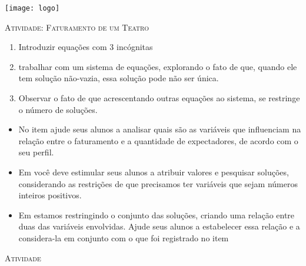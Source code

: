 \documentclass[10 pt,usenames,dvipsnames, oneside]{article}
\begin{document}
\begin{center}
  \begin{minipage}[l]{3cm}
\texttt{[image: logo]}    
\end{minipage}\hfill
\begin{minipage}[r]{.8\textwidth}
 {\Large \scshape Atividade: Faturamento de um Teatro}  
\end{minipage}
\end{center}
\vspace{.2cm}

\ifdefined\prof

\begin{goals}
\begin{enumerate}
\item  Introduzir equações com 3 incógnitas
\item trabalhar com um sistema de equações, explorando o fato de que, quando ele tem solução não-vazia, essa solução pode não ser única.
\item Observar o fato de que acrescentando outras equações ao sistema, se restringe o número de soluções.
\end{enumerate}

\tcblower

\begin{itemize}
\item No item  ajude seus alunos a analisar quais são as variáveis que influenciam na relação entre o faturamento e a quantidade de expectadores, de acordo com o seu perfil. 
\item Em  você deve estimular seus alunos a atribuir valores e pesquisar soluções, considerando as restrições de que precisamos ter variáveis que sejam números inteiros positivos. 
\item Em  estamos restringindo o conjunto das soluções, criando uma relação entre duas das variáveis envolvidas. Ajude seus alunos a estabelecer essa relação e a considera-la em conjunto com o que foi registrado no item 
\end{itemize}
\end{goals}

\bigskip
\begin{center}
{\large \scshape Atividade}
\end{center}
\fi
\end{document}
